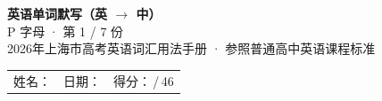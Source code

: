 \documentclass[10pt,a4paper]{article}
\begin{document}
\pagestyle{plain}

\begin{center}
{\LARGE\bfseries 英语单词默写（英 $\to$ 中）}\\[0.22em]
{\large P 字母 · 第 1 / 7 份}\\[0.18em]
{\small 2026年上海市高考英语词汇用法手册 · 参照普通高中英语课程标准}
\end{center}

\vspace{0.25em}
\noindent\begin{tabular}{@{}p{}@{}p{}@{}p{}@{}}
姓名：\underline{\hspace{2.0cm}} & 日期：\underline{\hspace{2.0cm}} & 得分：\underline{\hspace{1.3cm}}\,/\,46 \\
\end{tabular}

\vspace{0.3em}

\vspace{0.08em}
\end{document}
